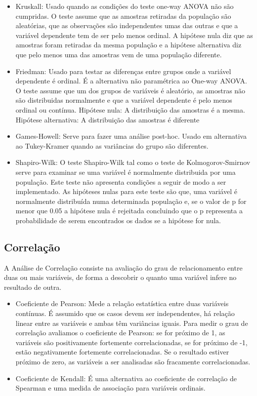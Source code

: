 \documentclass[conference]{IEEEtran}
\begin{document}
\begin{itemize}
    \item Kruskall: Usado quando as condições do teste one-way ANOVA não são cumpridas. O teste assume que as amostras retiradas da população são aleatórias, que as observações são independentes umas das outras e que a variável dependente tem de ser pelo menos ordinal.
A hipótese nula diz que as amostras foram retiradas da mesma população e a hipótese alternativa diz que pelo menos uma das amostras vem de uma população diferente.  
        
    \item Friedman: Usado para testar as diferenças entre grupos onde a variável dependente é ordinal. É a alternativa não paramétrica ao One-way ANOVA. O teste assume que um dos grupos de variáveis é aleatório, as amostras não são distribuidas normalmente e que a variável dependente é pelo menos ordinal ou contínua.
Hipótese nula: A distribuição das amostras é a mesma. Hipótese alternativa: A distribuição das amostras é diferente
        
    \item Games-Howell: Serve para fazer uma análise post-hoc. Usado em alternativa ao Tukey-Kramer quando as variâncias do grupo são diferentes.
        
    \item Shapiro-Wilk: O teste Shapiro-Wilk tal como o teste de Kolmogorov-Smirnov serve para examinar se uma variável é normalmente distribuida por uma população. Este teste não apresenta condições a seguir de modo a ser implementado. 
As hipóteses nulas para este teste são que, uma variável é normalmente distribuída numa determinada população e, se o valor de p for menor que 0.05 a hipótese nula é rejeitada concluindo que o p representa a probabilidade de serem encontrados os dados se a hipótese for nula.
\end{itemize}

\subsection{Correlação}            

A Análise de Correlação consiste na avaliação do grau de relacionamento entre duas ou mais variáveis, de forma a descobrir
o quanto uma variável infere no resultado de outra.

\begin{itemize}
    \item Coeficiente de Pearson: Mede a relação estatística entre duas variáveis contínuas. É assumido que os casos devem ser independentes, há relação linear entre as variáveis e ambas têm variâncias iguais.
Para medir o grau de correlação avaliamos o coeficiente de Pearson: se for próximo de 1, as variáveis são positivamente fortemente correlacionadas, se for próximo de -1, estão negativamente fortemente correlacionadas. Se o resultado estiver próximo de zero, as variáveis a ser analisadas são fracamente correlacionadas.

    \item Coeficiente de Kendall: É uma alternativa ao coeficiente de correlação de Spearman e uma medida de associação para variáveis ordinais.
\end{itemize}
\end{document}
